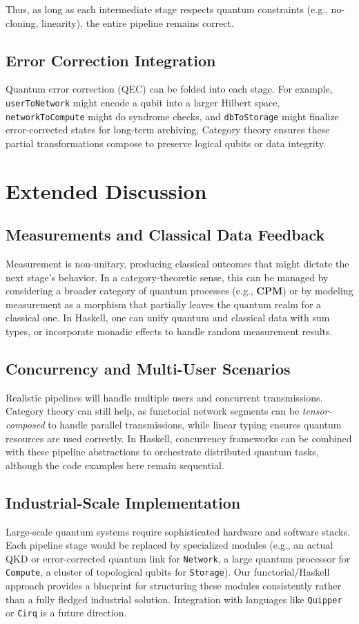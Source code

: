 \documentclass[12pt]{article}
\begin{document}
Thus, as long as each intermediate stage respects quantum constraints
(e.g., no-cloning, linearity), the entire pipeline remains correct.

\subsection{Error Correction Integration}

Quantum error correction (QEC) can be folded into each stage. For
example, \texttt{userToNetwork} might encode a qubit into a larger
Hilbert space, \texttt{networkToCompute} might do syndrome checks,
and \texttt{dbToStorage} might finalize error-corrected states for
long-term archiving. Category theory ensures these partial
transformations compose to preserve logical qubits or data integrity.

\section{Extended Discussion}

\subsection{Measurements and Classical Data Feedback}
Measurement is non-unitary, producing classical outcomes that might
dictate the next stage’s behavior. In a category-theoretic sense,
this can be managed by considering a broader category of quantum
processes (e.g., \(\mathbf{CPM}\)) or by modeling measurement as a
morphism that partially leaves the quantum realm for a classical
one. In Haskell, one can unify quantum and classical data with
sum types, or incorporate monadic effects to handle random
measurement results.

\subsection{Concurrency and Multi-User Scenarios}
Realistic pipelines will handle multiple users and concurrent
transmissions. Category theory can still help, as functorial
network segments can be \emph{tensor-composed} to handle parallel
transmissions, while linear typing ensures quantum resources are
used correctly. In Haskell, concurrency frameworks can be combined
with these pipeline abstractions to orchestrate distributed quantum
tasks, although the code examples here remain sequential.

\subsection{Industrial-Scale Implementation}
Large-scale quantum systems require sophisticated hardware and
software stacks. Each pipeline stage would be replaced by specialized
modules (e.g., an actual QKD or error-corrected quantum link for
\texttt{Network}, a large quantum processor for \texttt{Compute},
a cluster of topological qubits for \texttt{Storage}). Our
functorial/Haskell approach provides a blueprint for structuring
these modules consistently rather than a fully fledged industrial
solution. Integration with languages like \texttt{Quipper} or
\texttt{Cirq} is a future direction.
\end{document}
